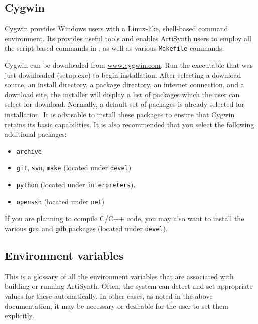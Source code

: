 \subsection{Cygwin}
\label{Cygwin}

Cygwin provides Windows users with a Linux-like, shell-based command
environment.  Its provides useful tools and enables ArtiSynth users to
employ all the script-based commands in , as well
as various {\tt Makefile} commands.

Cygwin can be downloaded from 
\href{http://www.cygwin.com}{www.cygwin.com}. Run the
executable that was just downloaded (setup.exe) to begin
installation. After selecting a download source, an install directory,
a package directory, an internet connection, and a download site, the
installer will display a list of packages which the user can select
for download. Normally, a default set of packages is already selected
for installation. It is advisable to install these packages to ensure
that Cygwin retains its basic capabilities. It is also recommended
that you select the following additional packages:

\begin{itemize}

\item {\tt archive}
\item {\tt git}, {\tt svn}, {\tt make} (located under {\tt devel})
\item {\tt python} (located under {\tt interpreters}).
\item {\tt openssh} (located under {\tt net})

\end{itemize}

If you are planning to compile C/C++ code, you may also want to
install the various {\tt gcc} and {\tt gdb} packages (located under {\tt devel}).
\fi

\subsection{Environment variables}
\label{EnvironmentVariables}

This is a glossary of all the environment variables that are
associated with building or running ArtiSynth. Often, the system can
detect and set appropriate values for these automatically. In other
cases, as noted in the above documentation, it may be necessary or
desirable for the user to set them explicitly.


